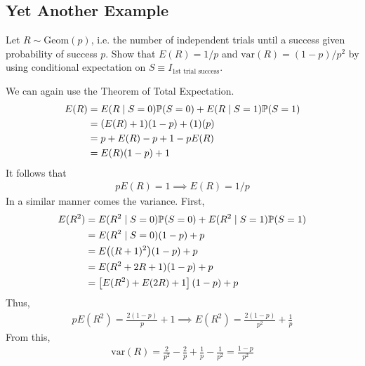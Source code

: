 \subsection{Yet Another Example}
\begin{proposition}
    Let $R \sim \text{Geom}(p)$, i.e. the number of independent trials until a success given probability of success $p$. Show that $E(R) = 1/p$ and $\text{var}(R) = (1-p)/p^2$ by using conditional expectation on $S \equiv I_{\text{1st trial success}}$.
\end{proposition}
\begin{solution}
    We can again use the Theorem of Total Expectation.
    \begin{align}
        E(R) &= E(R \mid S = 0) \mathbb{P}(S = 0) + E(R \mid S = 1) \mathbb{P}(S = 1)\\
        &= (E(R) + 1)(1-p) + (1)(p)\\
        &= p + E(R) - p + 1 - pE(R)\\
        &= E(R) (1 - p) + 1
    \end{align}
    It follows that
    \begin{align}
        pE(R) = 1 \implies \boxed{E(R) = 1/p}
    \end{align}
    In a similar manner comes the variance. First,
    \begin{align}
        E(R^2) &= E(R^2 \mid S = 0) \mathbb{P}(S = 0) + E(R^2 \mid S = 1) \mathbb{P}(S = 1)\\
        &= E(R^2 \mid S = 0) (1-p) + p\\
        &= E\qty((R+1)^2)(1-p) + p\\
        &= E(R^2 + 2R + 1)(1-p) + p\\
        &= \qty[E(R^2) + E(2R) + 1](1-p) + p
    \end{align}
    Thus,
    \begin{align}
        p E(R^2) = \frac{2(1-p)}{p} + 1 \implies \boxed{E(R^2) = \frac{2(1-p)}{p^2} + \frac{1}{p}}
    \end{align}
    From this,
    \begin{align}
        \text{var}(R) = \frac{2}{p^2} - \frac{2}{p} + \frac{1}{p} - \frac{1}{p^2} = \boxed{\frac{1-p}{p^2}}
    \end{align}
\end{solution}

